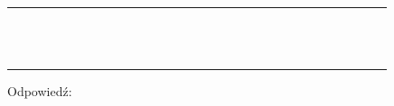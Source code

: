 \documentclass[10pt]{article}
\begin{document}
\begin{center}
\begin{tabular}{|c|c|c|c|c|c|c|c|c|c|c|c|c|c|c|c|c|c|c|c|c|c|c|c|c|c|c|c|c|c|}
\hline
 &  &  &  &  &  &  &  &  &  &  &  &  &  &  &  &  &  &  &  &  &  &  &  &  &  &  &  &  &  \\
\hline
 &  &  &  &  &  &  &  &  &  &  &  &  &  &  &  &  &  &  &  &  &  &  &  &  &  &  &  &  &  \\
\hline
 &  &  &  &  &  &  &  &  &  &  &  &  &  &  &  &  &  &  &  &  &  &  &  &  &  &  &  &  &  \\
\hline
 &  &  &  &  &  &  &  &  &  &  &  &  &  &  &  &  &  &  &  &  &  &  &  &  &  &  &  &  &  \\
\hline
 &  &  &  &  &  &  &  &  &  &  &  &  &  &  &  &  &  &  &  &  &  &  &  &  &  &  &  &  &  \\
\hline
 &  &  &  &  &  &  &  &  &  &  &  &  &  &  &  &  &  &  &  &  &  &  &  &  &  &  &  &  &  \\
\hline
 &  &  &  &  &  &  &  &  &  &  &  &  &  &  &  &  &  &  &  &  &  &  &  &  &  &  &  &  &  \\
\hline
 &  &  &  &  &  &  &  &  &  &  &  &  &  &  &  &  &  &  &  &  &  &  &  &  &  &  &  &  &  \\
\hline
 &  &  &  &  &  &  &  &  &  &  &  &  &  &  &  &  &  &  &  &  &  &  &  &  &  &  &  &  &  \\
\hline
 &  &  &  &  &  &  &  &  &  &  &  &  &  &  &  &  &  &  &  &  &  &  &  &  &  &  &  &  &  \\
\hline
 &  &  &  &  &  &  &  &  &  &  &  &  &  &  &  &  &  &  &  &  &  &  &  &  &  &  &  &  &  \\
\hline
 &  &  &  &  &  &  &  &  &  &  &  &  &  &  &  &  &  &  &  &  &  &  &  &  &  &  &  &  &  \\
\hline
 &  &  &  &  &  &  &  &  &  &  &  &  &  &  &  &  &  &  &  &  &  &  &  &  &  &  &  &  &  \\
\hline
 &  &  &  &  &  &  &  &  &  &  &  &  &  &  &  &  &  &  &  &  &  &  &  &  &  &  &  &  &  \\
\hline
\end{tabular}
\end{center}

Odpowiedź: \(\qquad\)
\end{document}
